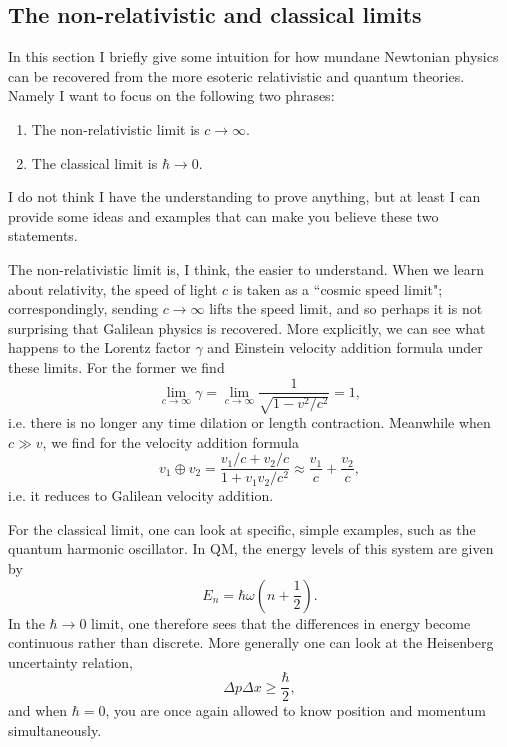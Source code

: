 \subsection{The non-relativistic and classical limits}

In this section I briefly give some intuition for how mundane Newtonian
physics can be recovered from the more esoteric relativistic and quantum
theories. Namely  I want to focus on 
the following two phrases:
\begin{enumerate}
  \item The non-relativistic limit is $c\to\infty$.
  \item The classical limit is $\hbar\to0$.
\end{enumerate}
I do not think I have the understanding to prove anything, but at least I
can provide some ideas and examples that can make you believe these
two statements.

The non-relativistic limit is, I think, the easier to understand. When we
learn about relativity, the speed of light $c$ is taken as a ``cosmic speed
limit"; correspondingly, sending $c\to\infty$ lifts the speed limit, and
so perhaps it is not surprising that Galilean physics is recovered.
More explicitly, we can see what happens to the Lorentz factor $\gamma$ and
Einstein velocity addition formula under these limits. For the former
we find
\begin{equation}
  \lim_{c\to\infty}\gamma
  =\lim_{c\to\infty}\frac{1}{\sqrt{1-v^2/c^2}}=1,
\end{equation}
i.e. there is no longer any time dilation or length contraction.
Meanwhile when $c\gg v$, we find for the velocity addition formula 
\begin{equation}
  v_1\oplus v_2
  =\frac{v_1/c + v_2/c}{1+v_1v_2/c^2}
  \approx \frac{v_1}{c} + \frac{v_2}{c}, 
\end{equation}
i.e. it reduces to Galilean velocity addition.

For the classical limit, one can look at specific, simple examples, such as
the quantum harmonic oscillator. In QM, the energy levels of this system
are given by
\begin{equation}
  E_n=\hbar\omega\left(n+\frac{1}{2}\right).
\end{equation}
In the $\hbar\to0$ limit, one therefore sees that the differences in energy
become continuous rather than discrete. More generally one can look at
the Heisenberg uncertainty relation,
\begin{equation}
  \Delta p\Delta x\geq \frac{\hbar}{2},
\end{equation}
and when $\hbar=0$, you are once again allowed to know position and
momentum simultaneously.


